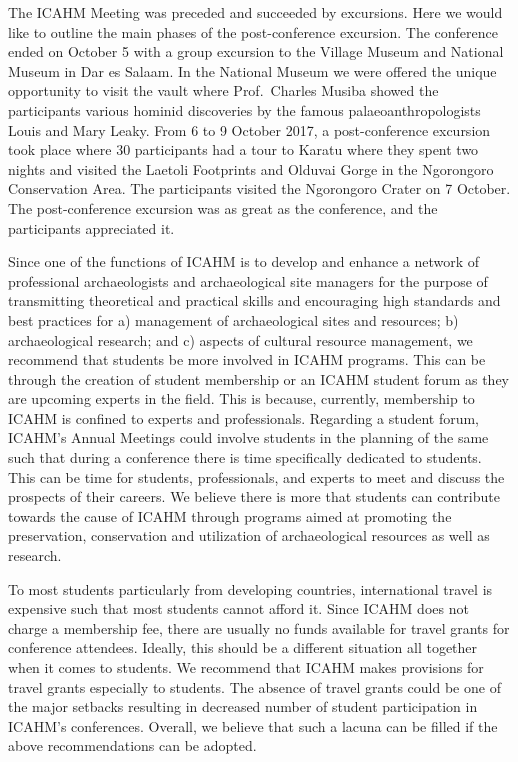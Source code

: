The ICAHM Meeting was preceded and succeeded by excursions. Here we would like to outline the main phases of the post-conference excursion. The conference ended on October 5 with a group excursion to the Village Museum and National Museum in Dar es Salaam. In the National Museum we were offered the unique opportunity to visit the vault where Prof.~Charles Musiba showed the participants various hominid discoveries by the famous palaeoanthropologists Louis and Mary Leaky.  From 6 to 9 October 2017, a post-conference excursion took place where 30 participants had a tour to Karatu where they spent two nights and visited the Laetoli Footprints and Olduvai Gorge in the Ngorongoro Conservation Area. The participants visited the Ngorongoro Crater on 7 October. The post-conference excursion was as great as the conference, and the participants appreciated it.


Since one of the functions of ICAHM is to develop and enhance a network of professional archaeologists and archaeological site managers for the purpose of transmitting theoretical and practical skills and encouraging high standards and best practices for a) management of archaeological sites and resources; b) archaeological research; and c) aspects of cultural resource management, we recommend that students be more involved in ICAHM programs. This can be through the creation of student membership or an ICAHM student forum as they are upcoming experts in the field. This is because, currently, membership to ICAHM is confined to experts and professionals. Regarding a student forum, ICAHM’s Annual Meetings could involve students in the planning of the same such that during a conference there is time specifically dedicated to students. This can be time for students, professionals, and experts to meet and discuss the prospects of their careers. We believe there is more that students can contribute towards the cause of ICAHM through programs aimed at promoting the preservation, conservation and utilization of archaeological resources as well as research.

To most students particularly from developing countries, international travel is expensive such that most students cannot afford it. Since ICAHM does not charge a membership fee, there are usually no funds available for travel grants for conference attendees.  Ideally, this should be a different situation all together when it comes to students. We recommend that ICAHM makes provisions for travel grants especially to students. The absence of travel grants could be one of the major setbacks resulting in decreased number of student participation in ICAHM’s conferences. Overall, we believe that such a lacuna can be filled if the above recommendations can be adopted.

